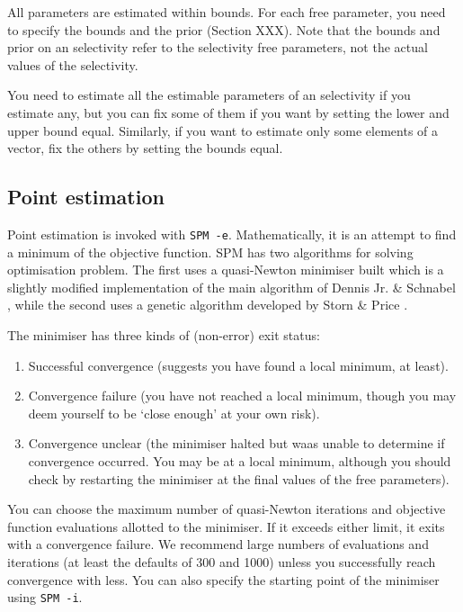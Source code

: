 All parameters are estimated within bounds. For each free parameter, you need to specify the bounds and the prior (Section XXX). Note that the bounds and prior on an selectivity refer to the selectivity free parameters, not the actual values of the selectivity. 

You need to estimate all the estimable parameters of an selectivity if you estimate any, but you can fix some of them if you want by setting the lower and upper bound equal. Similarly, if you want to estimate only some elements of a vector, fix the others by setting the bounds equal.

\subsection{Point estimation}

Point estimation is invoked with \texttt{SPM -e}. Mathematically, it is an attempt to find a minimum of the objective function. SPM has two algorithms for solving optimisation problem. The first uses a quasi-Newton minimiser built which is a slightly modified implementation of the main algorithm of Dennis Jr. \& Schnabel \citep{779}, while the second uses a genetic algorithm developed by Storn \& Price \citep{1442}.

The minimiser has three kinds of (non-error) exit status: 

\begin{enumerate}
\item Successful convergence (suggests you have found a local minimum, at least).
\item Convergence failure (you have not reached a local minimum, though you may deem yourself to be `close enough' at your own risk).
\item Convergence unclear (the minimiser halted but waas unable to determine if convergence occurred. You may be at a local minimum, although you should check by restarting the minimiser at the final values of the free parameters).
\end{enumerate}

You can choose the maximum number of quasi-Newton iterations and objective function evaluations allotted to the minimiser. If it exceeds either limit, it exits with a convergence failure. We recommend large numbers of evaluations and iterations (at least the defaults of 300 and 1000) unless you successfully reach convergence with less. You can also specify the starting point of the minimiser using \texttt{SPM -i}.

